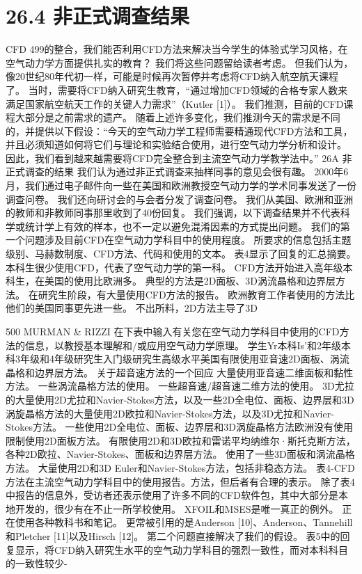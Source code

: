 \documentclass[UTF8,11pt,a4paper,openany,fontset=fandol]{ctexbook}
\begin{document}
\section{26.4 非正式调查结果}
CFD 499的整合，我们能否利用CFD方法来解决当今学生的体验式学习风格，在空气动力学方面提供扎实的教育？ 我们将这些问题留给读者考虑。 但我们认为，像20世纪80年代初一样，可能是时候再次暂停并考虑将CFD纳入航空航天课程了。 当时，需要将CFD纳入研究生教育，“通过增加CFD领域的合格专家人数来满足国家航空航天工作的关键人力需求”（Kutler [1]）。 我们推测，目前的CFD课程大部分是之前需求的遗产。 随着上述许多变化，我们推测今天的需求是不同的，并提供以下假设：“今天的空气动力学工程师需要精通现代CFD方法和工具，并且必须知道如何将它们与理论和实验结合使用，进行空气动力学分析和设计。 因此，我们看到越来越需要将CFD完全整合到主流空气动力学教学法中。” 26A 非正式调查的结果 我们认为通过非正式调查来抽样同事的意见会很有趣。 2000年6月，我们通过电子邮件向一些在美国和欧洲教授空气动力学的学术同事发送了一份调查问卷。 我们还向研讨会的与会者分发了调查问卷。 我们从美国、欧洲和亚洲的教师和非教师同事那里收到了40份回复。 我们强调，以下调查结果并不代表科学或统计学上有效的样本，也不一定以避免混淆因素的方式提出问题。 我们的第一个问题涉及目前CFD在空气动力学科目中的使用程度。 所要求的信息包括主题级别、马赫数制度、CFD方法、代码和使用的文本。 表4显示了回复的汇总摘要。 本科生很少使用CFD，代表了空气动力学的第一科。 CFD方法开始进入高年级本科生，在美国的使用比欧洲多。 典型的方法是2D面板、3D涡流晶格和边界层方法。 在研究生阶段，有大量使用CFD方法的报告。 欧洲教育工作者使用的方法比他们的美国同事更先进一些。 不出所料，2D方法主导了3D

500 MURMAN \& RIZZI 在下表中输入有关您在空气动力学科目中使用的CFD方法的信息，以教授基本理解和/或应用空气动力学原理。 学生Yr本科Is'和2年级本科3年级和4年级研究生入门级研究生高级水平美国有限使用亚音速2D面板、涡流晶格和边界层方法。 关于超音速方法的一个回应 大量使用亚音速二维面板和黏性方法。 一些涡流晶格方法的使用。 一些超音速/超音速二维方法的使用。 3D尤拉的大量使用2D尤拉和Navier-Stokes方法，以及一些2D全电位、面板、边界层和3D涡旋晶格方法的大量使用2D欧拉和Navier-Stokes方法，以及3D尤拉和Navier-Stokes方法。 一些使用2D全电位、面板、边界层和3D涡旋晶格方法欧洲没有使用限制使用2D面板方法。 有限使用2D和3D欧拉和雷诺平均纳维尔·斯托克斯方法，各种2D欧拉、Navier-Stokes、面板和边界层方法。 使用了一些3D面板和涡流晶格方法。 大量使用2D和3D Euler和Navier-Stokes方法，包括非稳态方法。 表4-CFD方法在主流空气动力学科目中的使用报告。方法，但后者有合理的表示。 除了表4中报告的信息外，受访者还表示使用了许多不同的CFD软件包，其中大部分是本地开发的，很少有在不止一所学校使用。 XFOIL和MSES是唯一真正的例外。 正在使用各种教科书和笔记。 更常被引用的是Anderson [10]、Anderson、Tannehill和Pletcher [11]以及Hirsch [12]。 第二个问题直接解决了我们的假设。 表5中的回复显示，将CFD纳入研究生水平的空气动力学科目的强烈一致性，而对本科科目的一致性较少-
\end{document}
